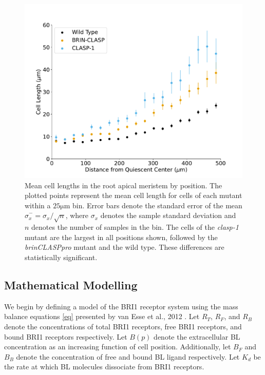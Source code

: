 \documentclass[referee,pdflatex,sn-mathphys-num]{sn-jnl}
\newcommand{\um}{\unit{\micro\metre}}
\begin{document}
\begin{figure}
\centering
\includegraphics[width=\textwidth]{data-binned-500.pdf}
\caption{Mean cell lengths in the root apical meristem by position. The plotted points represent the mean cell length for cells of each mutant within a $25\um$ bin. Error bars denote the standard error of the mean $\hat{\sigma}_{x}^{-} = \sigma_{x} / \sqrt{n}$, where $\sigma_{x}$ denotes the sample standard deviation and $n$ denotes the number of samples in the bin. The cells of the \emph{clasp-1} mutant are the largest in all positions shown, followed by the \emph{brinCLASPpro} mutant and the wild type. These differences are statistically significant.}
\label{data-binned}
\end{figure}

\subsection{Mathematical Modelling}\label{22}

We begin by defining a model of the BRI1 receptor system using the mass balance equations \eqref{eq} presented by van Esse et al., 2012 \cite{vanesse2012}. Let $R_{T}$, $R_{F}$, and $R_{B}$ denote the concentrations of total BRI1 receptors, free BRI1 receptors, and bound BRI1 receptors respectively. Let $B(p)$ denote the extracellular BL concentration as an increasing function of cell position. Additionally, let $B_{F}$ and $B_{B}$ denote the concentration of free and bound BL ligand respectively. Let $K_{d}$ be the rate at which BL molecules dissociate from BRI1 receptors.
\end{document}
